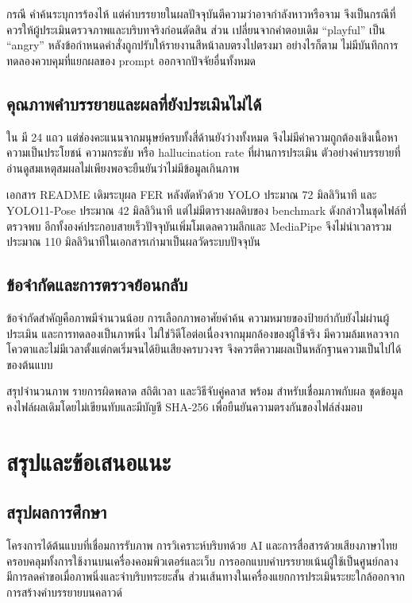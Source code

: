 กรณี  คำค้นระบุการร้องไห้ แต่คำบรรยายในผลปัจจุบันตีความว่าอาจกำลังหาวหรือจาม จึงเป็นกรณีที่ควรให้ผู้ประเมินตรวจภาพและบริบทจริงก่อนตัดสิน ส่วน  เปลี่ยนจากคำตอบเดิม ``playful'' เป็น ``angry'' หลังข้อกำหนดคำสั่งถูกปรับให้รายงานสีหน้าลบตรงไปตรงมา อย่างไรก็ตาม ไม่มีบันทึกการทดลองควบคุมที่แยกผลของ prompt ออกจากปัจจัยอื่นทั้งหมด

\section{คุณภาพคำบรรยายและผลที่ยังประเมินไม่ได้}
ใน  มี 24 แถว แต่ช่องคะแนนจากมนุษย์ครบทั้งสี่ด้านยังว่างทั้งหมด จึงไม่มีค่าความถูกต้องเชิงเนื้อหา ความเป็นประโยชน์ ความกระชับ หรือ hallucination rate ที่ผ่านการประเมิน ตัวอย่างคำบรรยายที่อ่านดูสมเหตุสมผลไม่เพียงพอจะยืนยันว่าไม่มีข้อมูลเกินภาพ

เอกสาร README เดิมระบุผล FER หลังตัดหัวด้วย YOLO ประมาณ 72 มิลลิวินาที และ YOLO11-Pose ประมาณ 42 มิลลิวินาที แต่ไม่มีตารางผลดิบของ benchmark ดังกล่าวในชุดไฟล์ที่ตรวจพบ อีกทั้งองค์ประกอบสายเร็วปัจจุบันเพิ่มโมเดลความลึกและ MediaPipe จึงไม่นำเวลารวมประมาณ 110 มิลลิวินาทีในเอกสารเก่ามาเป็นผลวัดระบบปัจจุบัน

\section{ข้อจำกัดและการตรวจย้อนกลับ}
ข้อจำกัดสำคัญคือภาพมีจำนวนน้อย การเลือกภาพอาศัยคำค้น ความหมายของป้ายกำกับยังไม่ผ่านผู้ประเมิน และการทดลองเป็นภาพนิ่ง ไม่ใช่วิดีโอต่อเนื่องจากมุมกล้องของผู้ใช้จริง มีความล้มเหลวจากโควตาและไม่มีเวลาตั้งแต่กดเริ่มจนได้ยินเสียงครบวงจร จึงควรตีความผลเป็นหลักฐานความเป็นไปได้ของต้นแบบ

 สรุปจำนวนภาพ รายการผิดพลาด สถิติเวลา และวิธีจับคู่คลาส พร้อม  สำหรับเชื่อมภาพกับผล ชุดข้อมูลคงไฟล์ผลเดิมโดยไม่เขียนทับและมีบัญชี SHA-256 เพื่อยืนยันความตรงกันของไฟล์ส่งมอบ

\chapter{สรุปและข้อเสนอแนะ}
\section{สรุปผลการศึกษา}
โครงการได้ต้นแบบที่เชื่อมการรับภาพ การวิเคราะห์บริบทด้วย AI และการสื่อสารด้วยเสียงภาษาไทย ครอบคลุมทั้งการใช้งานบนเครื่องคอมพิวเตอร์และเว็บ การออกแบบคำบรรยายเน้นผู้ใช้เป็นศูนย์กลาง มีการลดคำขอเมื่อภาพนิ่งและจำบริบทระยะสั้น ส่วนเส้นทางในเครื่องแยกการประเมินระยะใกล้ออกจากการสร้างคำบรรยายบนคลาวด์

